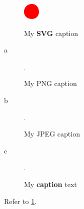 \documentclass{article}
\begin{document}
\begin{figure}[H]
  \includegraphics[alt={My \textbf{SVG} alt text}]{image.pdf}
  \caption{My \textbf{SVG} caption}
\end{figure}

a

\begin{figure}[H]
  \includegraphics[alt={my PNG alt text}]{image.png}
  \caption{My PNG caption}
\end{figure}

b

\begin{figure}[H]
  \includegraphics[alt={my JPEG alt text}]{image.jpg}
  \caption{My JPEG caption}
\end{figure}

c

\begin{figure}[H]
  \includegraphics[alt={My alt text}]{image.png}
  \caption{My \textbf{caption} text}
  \label{fig:logo}
\end{figure}

Refer to \cref{fig:logo}.
\end{document}
